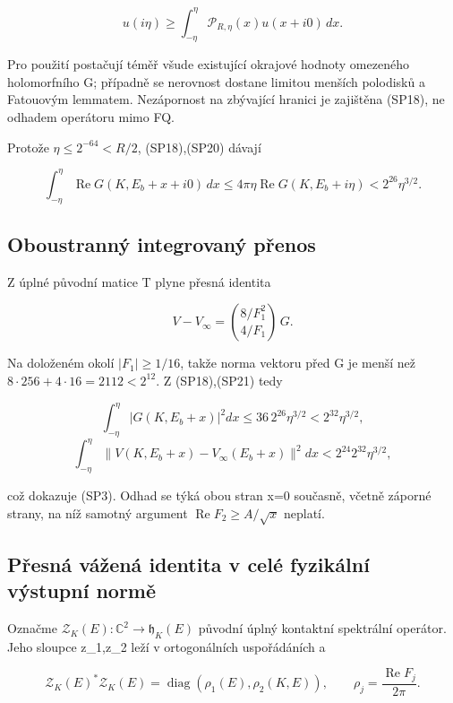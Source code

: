 \documentclass[11pt,a4paper]{article}
\theoremstyle{remark}\newtheorem{remark}[theorem]{Poznámka}
\numberwithin{equation}{section}
\begin{document}
\[
u(i\eta)\ge\int_{-\eta}^{\eta}
\mathcal P_{R,\eta}(x)u(x+i0)\,dx.
\]

Pro použití postačují téměř všude existující okrajové hodnoty omezeného
holomorfního G; případně se nerovnost dostane limitou menších polodisků
a Fatouovým lemmatem. Nezápornost na zbývající hranici je zajištěna
(SP18), ne odhadem operátoru mimo FQ.

Protože \(\eta\le2^{-64}<R/2\), (SP18),(SP20) dávají

\[
\boxed{
\int_{-\eta}^{\eta}
\operatorname{Re}G(K,E_b+x+i0)\,dx
\le4\pi\eta\operatorname{Re}G(K,E_b+i\eta)
<2^{26}\eta^{3/2}.}
\tag{SP21}
\]

\hypertarget{oboustrannuxfd-integrovanuxfd-pux159enos}{%
\subsection{Oboustranný integrovaný
přenos}\label{oboustrannuxfd-integrovanuxfd-pux159enos}}

Z úplné původní matice T plyne přesná identita

\[
V-V_\infty
=\binom{8/F_1^2}{4/F_1}\,G.
\tag{SP22}
\]

Na doloženém okolí \(|F_1|\ge1/16\), takže norma vektoru před G je menší
než \(8\cdot256+4\cdot16=2112<2^{12}\). Z (SP18),(SP21) tedy

\[
\int_{-\eta}^{\eta}|G(K,E_b+x)|^2dx
\le36\,2^{26}\eta^{3/2}<2^{32}\eta^{3/2},
\] \[
\int_{-\eta}^{\eta}\|V(K,E_b+x)-V_\infty(E_b+x)\|^2dx
<2^{24}2^{32}\eta^{3/2},
\]

což dokazuje (SP3). Odhad se týká obou stran x=0 současně, včetně
záporné strany, na níž samotný argument
\(\operatorname{Re}F_2\ge A/\sqrt x\) neplatí.

\hypertarget{pux159esnuxe1-vuxe1ux17eenuxe1-identita-v-celuxe9-fyzikuxe1lnuxed-vuxfdstupnuxed-normux11b}{%
\subsection{Přesná vážená identita v celé fyzikální výstupní
normě}\label{pux159esnuxe1-vuxe1ux17eenuxe1-identita-v-celuxe9-fyzikuxe1lnuxed-vuxfdstupnuxed-normux11b}}

Označme \(\mathcal Z_K(E):\mathbb C^2\to\mathfrak h_K(E)\) původní úplný
kontaktní spektrální operátor. Jeho sloupce z\_1,z\_2 leží v
ortogonálních uspořádáních a

\[
\mathcal Z_K(E)^*\mathcal Z_K(E)
=\operatorname{diag}(\rho_1(E),\rho_2(K,E)),
\qquad \rho_j=\frac{\operatorname{Re}F_j}{2\pi}.
\tag{SP23}
\]
\end{document}
